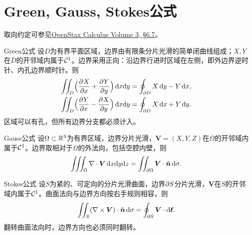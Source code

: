 \section{Green, Gauss, Stokes公式}
取向约定可参见\href{https://openstax.org/books/calculus-volume-3/pages/6-7-stokes-theorem}{OpenStax Calculus Volume 3, §6.7}。
\begin{theorem}{Green公式}{}
    设$D$为有界平面区域，边界由有限条分片光滑的简单闭曲线组成；$X,Y$在$\overline D$的开邻域内属于$\mathcal{C}^1$。边界采用正向：沿边界行进时区域在左侧，即外边界逆时针、内孔边界顺时针。则
    \begin{subequations}\label{eq:calc-green-formulas}
        \begin{align}
            \iint_D\Bigl(\frac{\partial^{}X}{\partial{x}^{}} + \frac{\partial^{}Y}{\partial{y}^{}}\Bigr)\mathop{}\!\mathrm{d} x\mathrm{d} y &= \oint_{\partial D}X\mathop{}\!\mathrm{d} y - Y\mathop{}\!\mathrm{d} x,\label{eq:calc-green-flux}\\
            \iint_D\Bigl(\frac{\partial^{}Y}{\partial{x}^{}} - \frac{\partial^{}X}{\partial{y}^{}}\Bigr)\mathop{}\!\mathrm{d} x\mathrm{d} y &= \oint_{\partial D}X\mathop{}\!\mathrm{d} x + Y\mathop{}\!\mathrm{d} y.\label{eq:calc-green-circulation}
        \end{align}
    \end{subequations}
    区域可以有孔，但所有边界分支都必须计入。
\end{theorem}
\begin{theorem}{Gauss公式}{}
    设$\Omega \subset \mathbb{R}^3$为有界区域，边界分片光滑，$\bm V = (X,Y,Z)$在$\overline\Omega$的开邻域内属于$\mathcal{C}^1$。边界取相对于$\Omega$的外法向，包括空腔内壁，则
    \begin{equation}\label{eq:calc-divergence-theorem}
        \iiint_\Omega\nabla\cdot\bm V\mathop{}\!\mathrm{d} x\mathrm{d} y\mathrm{d} z
        = \iint_{\partial\Omega}\bm V \cdot \mathop{}\!\hat{\bm{n}}\mathop{}\!\mathrm{d}\sigma.
    \end{equation}
\end{theorem}
\begin{theorem}{Stokes公式}{}
    设$S$为紧的、可定向的分片光滑曲面，边界$\partial S$分片光滑，$\bm V$在$S$的开邻域内属于$\mathcal{C}^1$。曲面法向与边界方向按右手规则相容，则
    \begin{equation}\label{eq:calc-stokes-theorem}
        \iint_S(\nabla\times\bm V) \cdot \mathop{}\!\hat{\bm{n}}\mathop{}\!\mathrm{d}\sigma
        = \oint_{\partial S}\bm V \cdot \mathop{}\!\mathrm{d}\bm\ell.
    \end{equation}
    翻转曲面法向时，边界方向也必须同时翻转。
\end{theorem}
